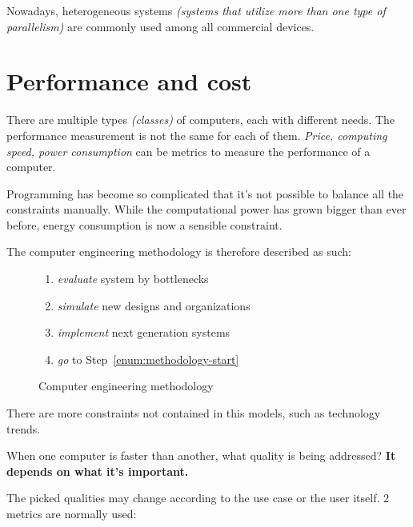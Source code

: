 \documentclass[english]{article}
\begin{document}
Nowadays, heterogeneous systems \textit{(systems that utilize more than one type of parallelism)} are commonly used among all commercial devices.

\clearpage

\section{Performance and cost}

There are multiple types \textit{(classes)} of computers, each with different needs.
The performance measurement is not the same for each of them.
\textit{Price, computing speed, power consumption} can be metrics to measure the performance of a computer.

Programming has become so complicated that it's not possible to balance all the constraints manually.
While the computational power has grown bigger than ever before, energy consumption is now a sensible constraint.

The computer engineering methodology is therefore described as such:

\begin{figure}[htbp]
  \bigskip
  \centering
  \begin{minipage}[h]{0.495\textwidth}
    \centering
  \end{minipage}
  \begin{minipage}[h]{0.495\textwidth}
    \begin{enumerate}
      \item \label{enum:methodology-start} \textit{evaluate} system by bottlenecks
      \item \textit{simulate} new designs and organizations
      \item \textit{implement} next generation systems
      \item \textit{go} to Step~\ref{enum:methodology-start}
    \end{enumerate}
  \end{minipage}
  \caption{Computer engineering methodology}
  \label{fig:computer-engineering-methodology}
  \bigskip
\end{figure}

There are more constraints not contained in this models, such as technology trends.

\bigskip
When one computer is faster than another, what quality is being addressed?
\textbf{It depends on what it's important.}

The picked qualities may change according to the use case or the user itself.
2 metrics are normally used:
\end{document}

